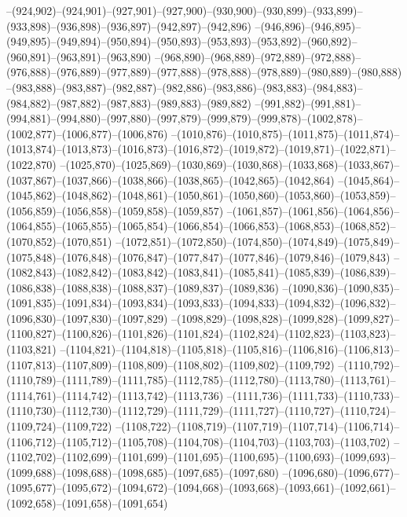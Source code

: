 --(924,902)--(924,901)--(927,901)--(927,900)--(930,900)--(930,899)--(933,899)--(933,898)--(936,898)--(936,897)--(942,897)--(942,896)
--(946,896)--(946,895)--(949,895)--(949,894)--(950,894)--(950,893)--(953,893)--(953,892)--(960,892)--(960,891)--(963,891)--(963,890)
--(968,890)--(968,889)--(972,889)--(972,888)--(976,888)--(976,889)--(977,889)--(977,888)--(978,888)--(978,889)--(980,889)--(980,888)
--(983,888)--(983,887)--(982,887)--(982,886)--(983,886)--(983,883)--(984,883)--(984,882)--(987,882)--(987,883)--(989,883)--(989,882)
--(991,882)--(991,881)--(994,881)--(994,880)--(997,880)--(997,879)--(999,879)--(999,878)--(1002,878)--(1002,877)--(1006,877)--(1006,876)
--(1010,876)--(1010,875)--(1011,875)--(1011,874)--(1013,874)--(1013,873)--(1016,873)--(1016,872)--(1019,872)--(1019,871)--(1022,871)--(1022,870)
--(1025,870)--(1025,869)--(1030,869)--(1030,868)--(1033,868)--(1033,867)--(1037,867)--(1037,866)--(1038,866)--(1038,865)--(1042,865)--(1042,864)
--(1045,864)--(1045,862)--(1048,862)--(1048,861)--(1050,861)--(1050,860)--(1053,860)--(1053,859)--(1056,859)--(1056,858)--(1059,858)--(1059,857)
--(1061,857)--(1061,856)--(1064,856)--(1064,855)--(1065,855)--(1065,854)--(1066,854)--(1066,853)--(1068,853)--(1068,852)--(1070,852)--(1070,851)
--(1072,851)--(1072,850)--(1074,850)--(1074,849)--(1075,849)--(1075,848)--(1076,848)--(1076,847)--(1077,847)--(1077,846)--(1079,846)--(1079,843)
--(1082,843)--(1082,842)--(1083,842)--(1083,841)--(1085,841)--(1085,839)--(1086,839)--(1086,838)--(1088,838)--(1088,837)--(1089,837)--(1089,836)
--(1090,836)--(1090,835)--(1091,835)--(1091,834)--(1093,834)--(1093,833)--(1094,833)--(1094,832)--(1096,832)--(1096,830)--(1097,830)--(1097,829)
--(1098,829)--(1098,828)--(1099,828)--(1099,827)--(1100,827)--(1100,826)--(1101,826)--(1101,824)--(1102,824)--(1102,823)--(1103,823)--(1103,821)
--(1104,821)--(1104,818)--(1105,818)--(1105,816)--(1106,816)--(1106,813)--(1107,813)--(1107,809)--(1108,809)--(1108,802)--(1109,802)--(1109,792)
--(1110,792)--(1110,789)--(1111,789)--(1111,785)--(1112,785)--(1112,780)--(1113,780)--(1113,761)--(1114,761)--(1114,742)--(1113,742)--(1113,736)
--(1111,736)--(1111,733)--(1110,733)--(1110,730)--(1112,730)--(1112,729)--(1111,729)--(1111,727)--(1110,727)--(1110,724)--(1109,724)--(1109,722)
--(1108,722)--(1108,719)--(1107,719)--(1107,714)--(1106,714)--(1106,712)--(1105,712)--(1105,708)--(1104,708)--(1104,703)--(1103,703)--(1103,702)
--(1102,702)--(1102,699)--(1101,699)--(1101,695)--(1100,695)--(1100,693)--(1099,693)--(1099,688)--(1098,688)--(1098,685)--(1097,685)--(1097,680)
--(1096,680)--(1096,677)--(1095,677)--(1095,672)--(1094,672)--(1094,668)--(1093,668)--(1093,661)--(1092,661)--(1092,658)--(1091,658)--(1091,654)
